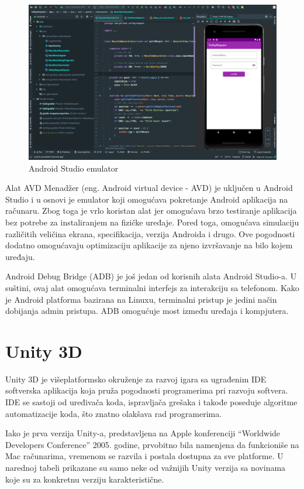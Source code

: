 \documentclass[12pt]{article}
\begin{document}
\begin{figure}[ht!]
    \centering
    \includegraphics[scale=0.25]{android_studio_emulator.png}
    \caption{Android Studio emulator}
    \label{fig:emulator_android_studija}
\end{figure}
\pagebreak

Alat AVD Menadžer (eng. Android virtual device - AVD) je uključen u Android Studio i u osnovi je emulator koji omogućava pokretanje Android aplikacija na računaru. Zbog toga je vrlo koristan alat jer omogućava brzo testiranje aplikacija bez potrebe za instaliranjem na fizičke uređaje. Pored toga, omogućava simulaciju različitih veličina ekrana, specifikacija, verzija Androida i drugo. Ove pogodnosti dodatno omogućavaju optimizaciju aplikacije za njeno izvršavanje na bilo kojem uređaju.

Android Debug Bridge (ADB) je još jedan od korisnih alata Android Studio-a. U suštini, ovaj alat omogućava terminalni interfejs za interakciju sa telefonom. Kako je Android platforma bazirana na Linuxu, terminalni pristup je jedini način dobijanja admin pristupa. ADB omogućuje most između uređaja i kompjutera.
\pagebreak

\section{Unity 3D}

Unity 3D je višeplatformsko okruženje za razvoj igara sa ugrađenim IDE softverska aplikacija koja pruža pogodnosti programerima pri razvoju softvera. IDE se sastoji od uređivača koda, ispravljača grešaka i takođe poseduje algoritme automatizacije koda, što znatno olakšava rad programerima. \cite{Unity1}

Iako je prva verzija Unity-a, predstavljena na Apple konferenciji “Worldwide Developers Conference” 2005. godine, prvobitno bila namenjena da funkcioniše na Mac računarima, vremenom se razvila i postala dostupna za sve platforme. U narednoj tabeli prikazane su samo neke od važnijih Unity verzija sa novinama koje su za konkretnu verziju karakteristične.
\end{document}
